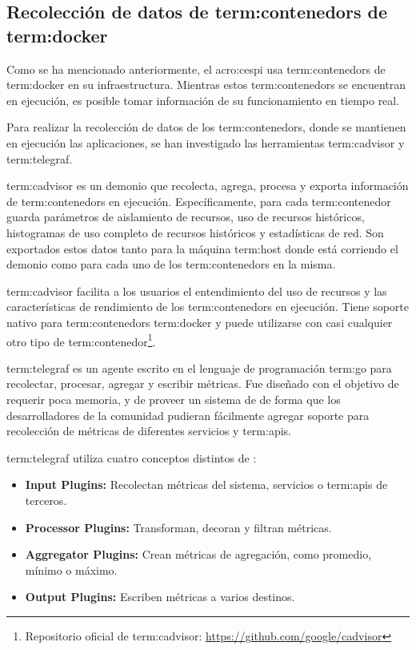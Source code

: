 \subsection{Recolección de datos de \glspl{term:contenedor} de \gls{term:docker}}
\label{contenedores}

Como se ha mencionado anteriormente, el \gls{acro:cespi} usa
\glspl{term:contenedor} de \gls{term:docker} en su infraestructura. Mientras
estos \glspl{term:contenedor} se encuentran en ejecución, es posible tomar
información de su funcionamiento en tiempo real.

Para realizar la recolección de datos de los \glspl{term:contenedor}, donde se
mantienen en ejecución las aplicaciones, se han investigado las herramientas
\gls{term:cadvisor} y \gls{term:telegraf}.

\gls{term:cadvisor} es un demonio que recolecta, agrega, procesa y exporta
información de \glspl{term:contenedor} en ejecución. Específicamente, para cada
\gls{term:contenedor} guarda parámetros de aislamiento de recursos, uso de
recursos históricos, histogramas de uso completo de recursos históricos y
estadísticas de red. Son exportados estos datos tanto para la máquina
\gls{term:host} donde está corriendo el demonio como para cada uno de los
\glspl{term:contenedor} en la misma.

\gls{term:cadvisor} facilita a los usuarios el entendimiento del uso de
recursos y las características de rendimiento de los \glspl{term:contenedor} en
ejecución.  Tiene soporte nativo para \glspl{term:contenedor} \gls{term:docker}
y puede utilizarse con casi cualquier otro tipo de
\gls{term:contenedor}\footnote{
Repositorio oficial de \gls{term:cadvisor}:
\url{https://github.com/google/cadvisor}}.

\gls{term:telegraf} es un agente escrito en el lenguaje de programación
\gls{term:go} para recolectar, procesar, agregar y escribir métricas. Fue
diseñado con el objetivo de requerir poca memoria, y de proveer un sistema de
 de forma que los desarrolladores de la comunidad pudieran
fácilmente agregar soporte para recolección de métricas de diferentes servicios
y \glspl{term:api}.

\gls{term:telegraf} utiliza cuatro conceptos distintos de :

\begin{itemize}

  \item \textbf{Input Plugins:}
  Recolectan métricas del sistema, servicios o \glspl{term:api} de terceros.

  \item \textbf{Processor Plugins:}
  Transforman, decoran y filtran métricas.

  \item \textbf{Aggregator Plugins:}
  Crean métricas de agregación, como promedio, mínimo o máximo.

  \item \textbf{Output Plugins:}
  Escriben métricas a varios destinos.

\end{itemize}

